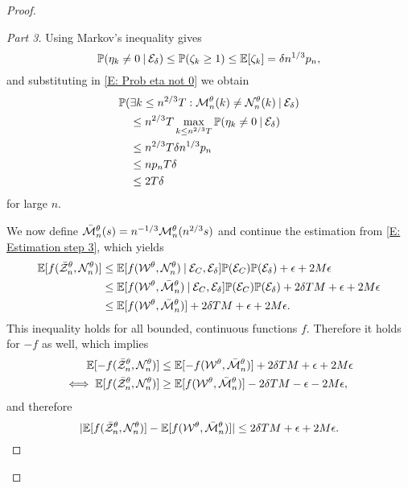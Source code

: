 \begin{proof}
\begin{proof}[Part 3]
Using Markov's inequality gives
\begin{equation}
\mathbb{P}( \eta_k \neq 0 \: | \: \mathcal{E}_{\delta} ) \leq \mathbb{P}( \zeta_k \geq 1 ) \leq \mathbb{E}[\zeta_k] = \delta n^{1 / 3}p_n,
\end{equation}
and substituting in \eqref{E: Prob eta not 0} we obtain
\begin{equation}
\begin{aligned}
&\mathbb{P}(\exists k\leq n^{2 / 3}T: \mathcal{M}_n^{\theta}(k) \neq \mathcal{N}_n^{\theta}(k) \: | \: \mathcal{E}_{\delta}) \\
&\quad \leq n^{2 / 3}T \max_{k \leq n^{2 / 3}T} \mathbb{P}( \eta_k \neq 0 \: | \: \mathcal{E}_{\delta} ) \\
&\quad \leq n^{2 / 3}T\delta n^{1 / 3}p_n \\
&\quad \leq n p_n T \delta \\
&\quad \leq 2T\delta 
\end{aligned}
\end{equation}
for large $n$.

We now define $\bar{\mathcal{M}}_n^{\theta}(s) = n^{-1 / 3} \mathcal{M}_n^{\theta}(n^{2 / 3}s)$ and continue the estimation from \eqref{E: Estimation step 3},
which yields
\begin{equation} \label{E: Estimation step 4}
\begin{aligned}
\mathbb{E}[f(\bar{\mathcal{Z}}^{\theta}_n, \mathcal{N}_n^{\theta})] 
&\leq \mathbb{E}[f(\mathcal{W}^{\theta}, \mathcal{N}_n^{\theta}) \: | \: \mathcal{E}_{C}, \mathcal{E}_{\delta}] \mathbb{P}(\mathcal{E}_{C}) \mathbb{P}(\mathcal{E}_{\delta}) + \epsilon + 2M\epsilon   \\
&\leq \mathbb{E}[f(\mathcal{W}^{\theta}, \bar{\mathcal{M}}_n^{\theta}) \: | \: \mathcal{E}_{C}, \mathcal{E}_{\delta}] \mathbb{P}(\mathcal{E}_{C}) \mathbb{P}(\mathcal{E}_{\delta}) + 2\delta T M + \epsilon  + 2M\epsilon \\
&\leq \mathbb{E}[f(\mathcal{W}^{\theta}, \bar{\mathcal{M}}_n^{\theta})] + 2\delta T M + \epsilon  + 2M\epsilon.
\end{aligned}
\end{equation}
This inequality holds for all bounded, continuous functions $f$. 
Therefore it holds for $-f$ as well, which implies
\begin{equation}
\begin{aligned}
\mathbb{E}[-f(\bar{\mathcal{Z}}^{\theta}_n, \mathcal{N}_n^{\theta})] &\leq \mathbb{E}[-f(\mathcal{W}^{\theta}, \bar{\mathcal{M}}_n^{\theta}) ]+ 2\delta T M  + \epsilon + 2M\epsilon \\
\iff  \mathbb{E}[f(\bar{\mathcal{Z}}^{\theta}_n, \mathcal{N}_n^{\theta})] &\geq \mathbb{E}[f(\mathcal{W}^{\theta}, \bar{\mathcal{M}}_n^{\theta}) ] - 2\delta T M  - \epsilon - 2M\epsilon,
\end{aligned}
\end{equation}
and therefore
\begin{equation} \label{E: Equality of Expectations}
	|\mathbb{E}[f(\bar{\mathcal{Z}}^{\theta}_n, \mathcal{N}_n^{\theta})] - \mathbb{E}[f(\mathcal{W}^{\theta}, \bar{\mathcal{M}}_n^{\theta})] | \leq 2\delta T M + \epsilon  + 2M\epsilon.
\end{equation}
\end{proof}


\end{proof}
